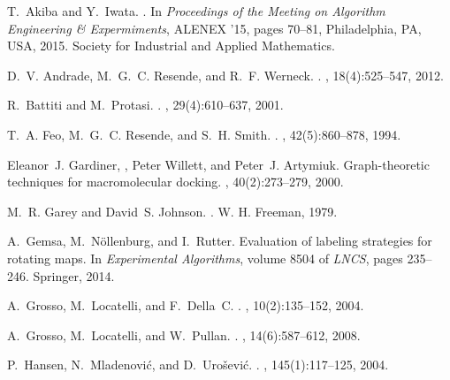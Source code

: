 \documentclass[11pt]{article}
\begin{document}
\begin{thebibliography}{10}

T.~Akiba and Y.~Iwata.
.
\newblock In {\em Proceedings of the Meeting on Algorithm Engineering \&
  Expermiments}, ALENEX '15, pages 70--81, Philadelphia, PA, USA, 2015. Society
  for Industrial and Applied Mathematics.

D.~V. Andrade, M.~G.~C. Resende, and R.~F. Werneck.
.
, 18(4):525--547, 2012.

R.~Battiti and M.~Protasi.
.
, 29(4):610--637, 2001.

T.~A. Feo, M.~G.~C. Resende, and S.~H. Smith.
.
, 42(5):860--878, 1994.

Eleanor~J. Gardiner, , Peter Willett, and Peter~J. Artymiuk.
\newblock Graph-theoretic techniques for macromolecular docking.
,
  40(2):273--279, 2000.

M.~R. Garey and David~S. Johnson.
.
\newblock W. H. Freeman, 1979.

A.~Gemsa, M.~Nöllenburg, and I.~Rutter.
\newblock Evaluation of labeling strategies for rotating maps.
\newblock In {\em Experimental Algorithms}, volume 8504 of {\em LNCS}, pages
  235--246. Springer, 2014.

A.~Grosso, M.~Locatelli, and F.~Della~C.
.
, 10(2):135--152, 2004.

A.~Grosso, M.~Locatelli, and W.~Pullan.
.
, 14(6):587--612, 2008.

P.~Hansen, N.~Mladenovi{\'c}, and D.~Uro{\v{s}}evi{\'c}.
.
, 145(1):117--125, 2004.


\end{thebibliography}
\end{document}
